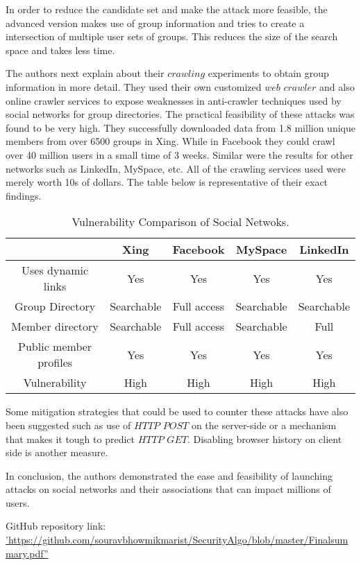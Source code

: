 \documentclass{article}
\begin{document}
In order to reduce the candidate set and make the attack more feasible, the advanced version makes use of group information and tries to create a intersection of multiple user sets of groups. This reduces the size of the search space and takes less time.

The authors next explain about their $crawling$ experiments to obtain group information in more detail. They used their own customized $web$ $crawler$ and also online crawler services to expose weaknesses in anti-crawler techniques used by social networks for group directories. The practical feasibility of these attacks was found to be very high. They successfully downloaded data from 1.8 million unique members from over 6500 groups in Xing. While in Facebook they could crawl  over 40 million users in a small time of 3 weeks. Similar were the results for other networks such as LinkedIn, MySpace, etc. All of the crawling services used were merely worth 10s of dollars. The table below is representative of their exact findings.

\begin{table}[h!]
  \centering
  \caption{Vulnerability Comparison of Social Netwoks.}
  \label{tab:table1}
  \begin{tabular}{ |c|c|c|c|c|}
\hline
      & Xing & Facebook & MySpace & LinkedIn\\
    \hline
    \hline
    Uses dynamic links & Yes & Yes & Yes & Yes\\
    \hline
   Group Directory & Searchable & Full access & Searchable & Searchable\\
   \hline
   Member directory & Searchable & Full access & Searchable & Full\\
   \hline
  Public member profiles & Yes & Yes & Yes & Yes\\
  \hline
  Vulnerability & High & High & High & High\\
 \hline
  \end{tabular}
\end{table}
Some mitigation strategies that could be used to counter these attacks have also been suggested such as use of $HTTP$ $POST$ on the server-side or a mechanism that makes it tough to predict $HTTP$ $GET$. Disabling browser history on client side is another measure.

In conclusion, the authors demonstrated the ease and feasibility of launching attacks on social networks and their associations that can impact millions of users.

GitHub repository link: \hyperref[label_name]{'https://github.com/souravbhowmikmarist/SecurityAlgo/blob/master/Finalsummary.pdf''}


	
\end{document}
